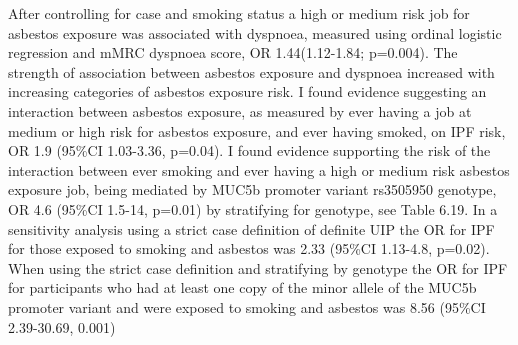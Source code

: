 After controlling for case and smoking status a high or medium risk job
for asbestos exposure was associated with dyspnoea, measured using
ordinal logistic regression and mMRC dyspnoea score, OR 1.44(1.12-1.84;
p=0.004). The strength of association between asbestos exposure and
dyspnoea increased with increasing categories of asbestos exposure risk.
I found evidence suggesting an interaction between asbestos exposure, as
measured by ever having a job at medium or high risk for asbestos
exposure, and ever having smoked, on IPF risk, OR 1.9 (95\%CI 1.03-3.36,
p=0.04). I found evidence supporting the risk of the interaction between
ever smoking and ever having a high or medium risk asbestos exposure
job, being mediated by MUC5b promoter variant rs3505950 genotype, OR 4.6
(95\%CI 1.5-14, p=0.01) by stratifying for genotype, see Table 6.19. In
a sensitivity analysis using a strict case definition of definite UIP
the OR for IPF for those exposed to smoking and asbestos was 2.33
(95\%CI 1.13-4.8, p=0.02). When using the strict case definition and
stratifying by genotype the OR for IPF for participants who had at least
one copy of the minor allele of the MUC5b promoter variant and were
exposed to smoking and asbestos was 8.56 (95\%CI 2.39-30.69, 0.001)

